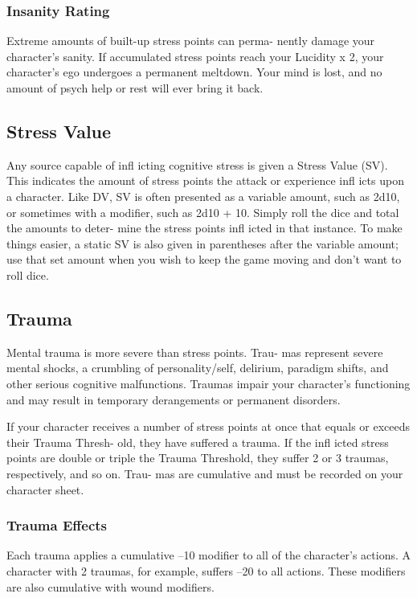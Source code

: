 \subsubsection{Insanity Rating}

Extreme amounts of built-up stress points can perma-
nently damage your character's sanity. If accumulated 
stress points reach your Lucidity x 2, your character's 
ego undergoes a permanent meltdown. Your mind is 
lost, and no amount of psych help or rest will ever 
bring it back.

\subsection{Stress Value}

Any source capable of infl icting cognitive stress is given 
a Stress Value (SV). This indicates the amount of stress 
points the attack or experience infl icts upon a character. 
Like DV, SV is often presented as a variable amount, such 
as 2d10, or sometimes with a modifier, such as 2d10 + 
10. Simply roll the dice and total the amounts to deter-
mine the stress points infl icted in that instance. To make 
things easier, a static SV is also given in parentheses after 
the variable amount; use that set amount when you wish 
to keep the game moving and don't want to roll dice.

\subsection{Trauma}

Mental trauma is more severe than stress points. Trau-
mas represent severe mental shocks, a crumbling of 
personality/self, delirium, paradigm shifts, and other 
serious cognitive malfunctions. Traumas impair your 
character's functioning and may result in temporary 
derangements or permanent disorders.

If your character receives a number of stress points 
at once that equals or exceeds their Trauma Thresh-
old, they have suffered a trauma. If the infl icted stress 
points are double or triple the Trauma Threshold, they 
suffer 2 or 3 traumas, respectively, and so on. Trau-
mas are cumulative and must be recorded on your 
character sheet.

\subsubsection{Trauma Effects}

Each trauma applies a cumulative –10 modifier to all 
of the character's actions. A character with 2 traumas, 
for example, suffers –20 to all actions. These modifiers 
are also cumulative with wound modifiers.

